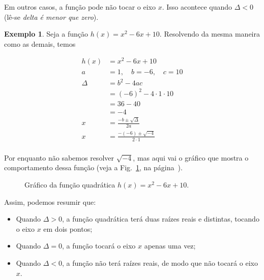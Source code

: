 \documentclass[12pt,openright,twoside,a4paper]{article}
\theoremstyle{definition}
\newtheorem{example}{Exemplo}[section]
\begin{document}
	Em outros casos, a função pode não tocar o eixo $x$. Isso acontece quando $\Delta < 0$ (lê-se \textit{delta é menor que zero}).
	\begin{example}
		Seja a função $h(x) = x^2 - 6x + 10$. Resolvendo da mesma maneira como as demais, temos
		
		\begin{align*}
			h(x) &= x^2 - 6x + 10 \\
			a &= 1,\quad b = -6,\quad c = 10 \\
			\Delta &= b^2 - 4ac \\
			&= (-6)^2 - 4 \cdot 1 \cdot 10 \\
			&= 36 - 40 \\
			&= -4 \\
			x &= \frac{-b \pm \sqrt{\Delta}}{2a} \\
			x &= \frac{-(-6) \pm \sqrt{-4}}{2 \cdot 1} \\
		\end{align*}
		
		Por enquanto não sabemos resolver $\sqrt{-4}$, mas aqui vai o gráfico que mostra o comportamento dessa função (veja a Fig.~\ref{fig:funcao_h}, na página~\pageref{fig:funcao_h}).
		
		\begin{figure}[h]
			\centering
			\caption{Gráfico da função quadrática $h(x) = x^2 - 6x + 10$.}
			\label{fig:funcao_h}
		\end{figure}
	\end{example}
	
	Assim, podemos resumir que:
	
	\begin{itemize}
		\item Quando $\Delta > 0$, a função quadrática terá duas raízes reais e distintas, tocando o eixo $x$ em dois pontos;
		\item Quando $\Delta = 0$, a função tocará o eixo $x$ apenas uma vez;
		\item Quando $\Delta < 0$, a função não terá raízes reais, de modo que não tocará o eixo $x$.
	\end{itemize}
	
\end{document}
